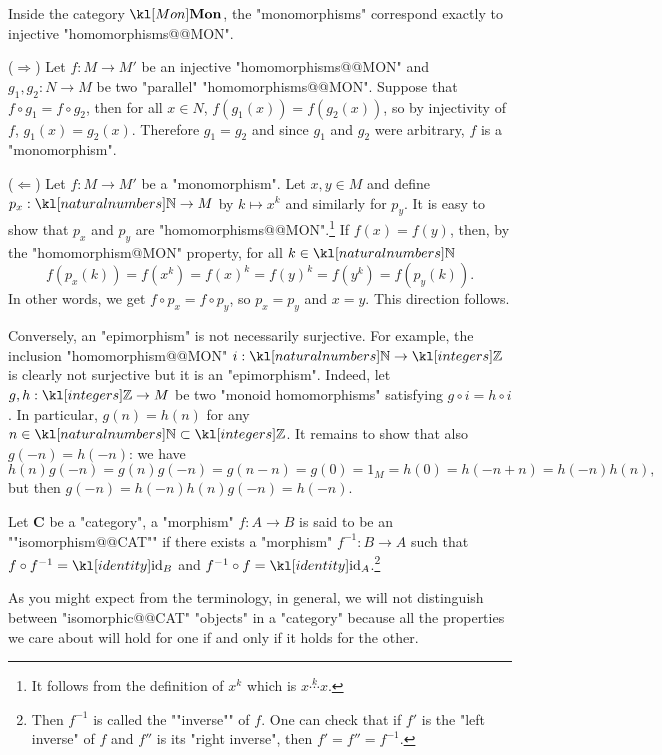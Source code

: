 \documentclass[main.tex]{subfiles}
\begin{document}
\begin{exmp}[$\catMon$]\label{exmp:monepiMON}%
Inside the category $\catMon$, the "monomorphisms" correspond exactly to injective "homomorphisms@@MON".

($\Rightarrow$) Let $f:M\rightarrow M'$ be an injective "homomorphisms@@MON" and $g_1,g_2:N\rightarrow M$ be two "parallel" "homomorphisms@@MON". Suppose that $f\circ g_1 = f\circ g_2$, then for all $x \in N$, $f(g_1(x)) = f(g_2(x))$, so by injectivity of $f$, $g_1(x) = g_2(x)$. Therefore $g_1 = g_2$ and since $g_1$ and $g_2$ were arbitrary, $f$ is a "monomorphism".

($\Leftarrow$) Let $f:M\rightarrow M'$ be a "monomorphism". Let $x,y \in M$ and define $p_x :\N \rightarrow M$ by $k\mapsto x^k$ and similarly for $p_y$. It is easy to show that $p_x$ and $p_y$ are "homomorphisms@@MON".\footnote{It follows from the definition of $x^k$ which is $x\stackrel{k}{\cdots}x$.} If $f(x) = f(y)$, then, by the "homomorphism@MON" property, for all $k \in \N$
\[f(p_x(k))= f(x^k) = f(x)^k  = f(y)^k = f(y^k) = f(p_y(k)).\]
In other words, we get $f\circ p_x = f \circ p_y$, so $p_x = p_y$ and $x = y$. This direction follows.

Conversely, an "epimorphism" is not necessarily surjective. For example, the inclusion "homomorphism@@MON" $i:\N \rightarrow \Z$ is clearly not surjective but it is an "epimorphism". Indeed, let $g,h: \Z\rightarrow M$ be two "monoid homomorphisms" satisfying $g \circ i = h\circ i$. In particular, $g(n) = h(n)$ for any $n \in \N\subset \Z$. It remains to show that also $g(-n) = h(-n)$: we have
\[ h(n)g(-n) = g(n)g(-n) = g(n-n) = g(0)= 1_M=h(0) = h(-n+n) = h(-n)h(n), \] but then $ g(-n) = h(-n)h(n)g(-n) = h(-n)$.
\end{exmp}
\begin{defn}[Isomorphism]
	\AP Let $\mathbf{C}$ be a "category", a "morphism" $f:A\rightarrow B$ is said to be an ""isomorphism@@CAT"" if there exists a "morphism" $f^{-1}: B\rightarrow A$ such that $f\circ f^{-1} = \id_B$ and $f^{-1}\circ f = \id_A$.\footnote{\AP Then $f^{-1}$ is called the ""inverse"" of $f$. One can check that if $f'$ is the "left inverse" of $f$ and $f''$ is its "right inverse", then $f' = f'' = f^{-1}$.}
\end{defn}
As you might expect from the terminology, in general, we will not distinguish between "isomorphic@@CAT" "objects" in a "category" because all the properties we care about will hold for one if and only if it holds for the other.
\end{document}
